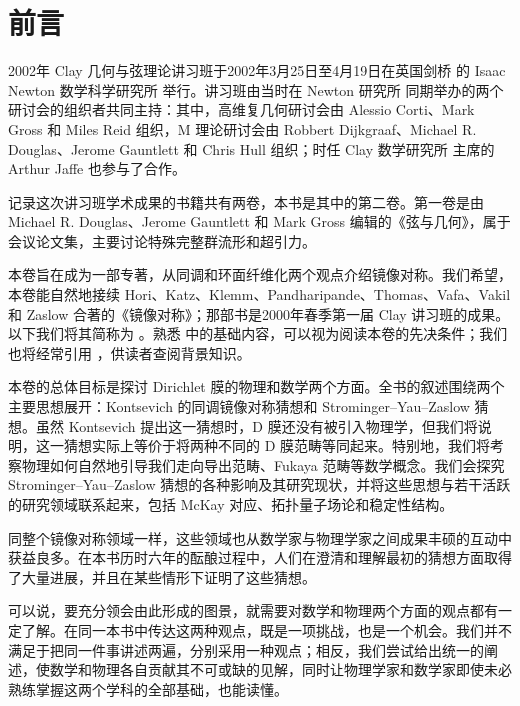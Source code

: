 \chapter*{前言}
\label{chap:preface}

2002年 Clay 几何与弦理论讲习班于2002年3月25日至4月19日在英国剑桥 的 Isaac Newton 数学科学研究所 举行。讲习班由当时在 Newton 研究所 同期举办的两个研讨会的组织者共同主持：其中，高维复几何研讨会由 Alessio Corti、Mark Gross 和 Miles Reid 组织，M 理论研讨会由 Robbert Dijkgraaf、Michael R. Douglas、Jerome Gauntlett 和 Chris Hull 组织；时任 Clay 数学研究所 主席的 Arthur Jaffe 也参与了合作。

记录这次讲习班学术成果的书籍共有两卷，本书是其中的第二卷。第一卷是由 Michael R. Douglas、Jerome Gauntlett 和 Mark Gross 编辑的《弦与几何》，属于会议论文集，主要讨论特殊完整群流形和超引力。

本卷旨在成为一部专著，从同调和环面纤维化两个观点介绍镜像对称。我们希望，本卷能自然地接续 Hori、Katz、Klemm、Pandharipande、Thomas、Vafa、Vakil 和 Zaslow 合著的《镜像对称》；那部书是2000年春季第一届 Clay 讲习班的成果。以下我们将其简称为 。熟悉  中的基础内容，可以视为阅读本卷的先决条件；我们也将经常引用 ，供读者查阅背景知识。

本卷的总体目标是探讨 Dirichlet 膜的物理和数学两个方面。全书的叙述围绕两个主要思想展开：Kontsevich 的同调镜像对称猜想和 Strominger--Yau--Zaslow 猜想。虽然 Kontsevich 提出这一猜想时，D 膜还没有被引入物理学，但我们将说明，这一猜想实际上等价于将两种不同的 D 膜范畴等同起来。特别地，我们将考察物理如何自然地引导我们走向导出范畴、Fukaya 范畴等数学概念。我们会探究 Strominger--Yau--Zaslow 猜想的各种影响及其研究现状，并将这些思想与若干活跃的研究领域联系起来，包括 McKay 对应、拓扑量子场论和稳定性结构。

同整个镜像对称领域一样，这些领域也从数学家与物理学家之间成果丰硕的互动中获益良多。在本书历时六年的酝酿过程中，人们在澄清和理解最初的猜想方面取得了大量进展，并且在某些情形下证明了这些猜想。

可以说，要充分领会由此形成的图景，就需要对数学和物理两个方面的观点都有一定了解。在同一本书中传达这两种观点，既是一项挑战，也是一个机会。我们并不满足于把同一件事讲述两遍，分别采用一种观点；相反，我们尝试给出统一的阐述，使数学和物理各自贡献其不可或缺的见解，同时让物理学家和数学家即使未必熟练掌握这两个学科的全部基础，也能读懂。

